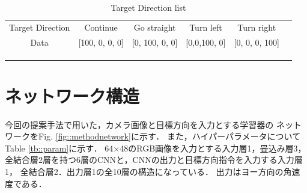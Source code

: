  \begin{table}[h]
      \centering
      \caption{Target Direction list}
      \begin{tabular}{ccccll}
      \cline{1-5}
      \multicolumn{1}{|c|}{Target Direction} & \multicolumn{1}{c|}{Continue}&\multicolumn{1}{c|}{Go straight}          & \multicolumn{1}{c|}{Turn left}          & \multicolumn{1}{c|}{Turn right}          &  \\ \cline{1-5}
      \multicolumn{1}{|c|}{Data}  &\multicolumn{1}{c|}{{[}100, 0, 0, 0{]}}& \multicolumn{1}{c|}{{[}0, 100, 0, 0{]}} & \multicolumn{1}{c|}{{[}0,0,100, 0{]}} & \multicolumn{1}{l|}{{[}0, 0, 0, 100{]}} &  \\ \cline{1-5}
                                 &                                  &                                  &                                  &  \\
                                 &                                  &                                  &                                  &  \\
      \multicolumn{1}{l}{}       &                                  &                                  &                                  & 
      \end{tabular}
      \vspace{-3.0zh}
      \label{tb:command_4}
      \end{table}
\newpage
\section{ネットワーク構造}
\label{net}
今回の提案手法で用いた，カメラ画像と目標方向を入力とする学習器の
ネットワークをFig. \ref{fig::methodnetwork}に示す．
また，ハイパーパラメータについてTable \ref{tb::param}に示す．
64×48のRGB画像を入力とする入力層1，畳込み層3，全結合層2層を持つ6層のCNNと，CNNの出力と目標方向指令を入力する入力層1，
全結合層2．出力層1の全10層の構造になっている．
出力はヨー方向の角速度である．

